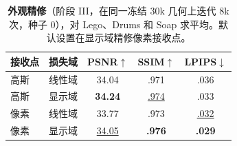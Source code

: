 \begin{table}[t]
\caption{\textbf{外观精修}（阶段 III，在同一冻结 30k 几何上迭代 8k 次，种子 0），对 Lego、Drums 和 Soap 求平均。默认设置在显示域精修像素接收点。}
\label{tab:refine}
\centering\small
\begin{tabular}{@{}llccc@{}}
\toprule
接收点 & 损失域 & PSNR$\uparrow$ & SSIM$\uparrow$ & LPIPS$\downarrow$ \\
\midrule
高斯 & 线性域 & 34.04 & .971 & .036 \\
高斯 & 显示域 & \textbf{34.24} & \underline{.974} & .033 \\
像素 & 线性域 & 33.77 & .973 & \underline{.032} \\
像素 & 显示域 & \underline{34.05} & \textbf{.976} & \textbf{.029} \\
\bottomrule
\end{tabular}
\end{table}
